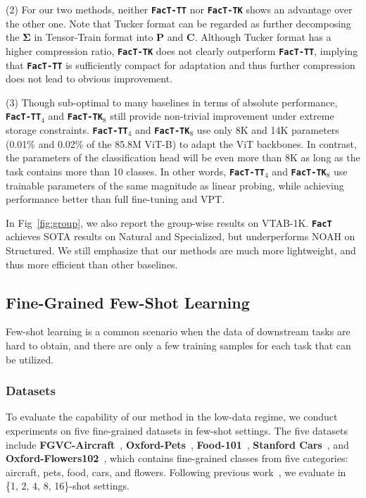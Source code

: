 (2) For our two methods, {neither \texttt{\textbf{FacT-TT}} nor \texttt{\textbf{FacT-TK}} shows an advantage over the other one.} Note that Tucker format can be regarded as further decomposing the $\boldsymbol{\Sigma}$ in Tensor-Train format into $\boldsymbol{P}$ and $\boldsymbol{C}$. Although Tucker format has a higher compression ratio, \texttt{\textbf{FacT-TK}} does not clearly outperform \texttt{\textbf{FacT-TT}}, implying that \texttt{\textbf{FacT-TT}} is sufficiently compact for adaptation and thus further compression does not lead to obvious improvement.

(3) Though sub-optimal to many baselines in terms of absolute performance, {\texttt{\textbf{FacT-TT}}$_{4}$ and \texttt{\textbf{FacT-TK}}$_{8}$ still provide non-trivial improvement under extreme storage constraints.} \texttt{\textbf{FacT-TT}}$_{4}$ and \texttt{\textbf{FacT-TK}}$_{8}$ use only 8K and 14K parameters (0.01\% and 0.02\% of the 85.8M ViT-B) to adapt the ViT backbones. In contrast, the parameters of the classification head will be even more than 8K as long as the task contains more than 10 classes. In other words, \texttt{\textbf{FacT-TT}}$_{4}$ and \texttt{\textbf{FacT-TK}}$_{8}$ use trainable parameters of the same magnitude as linear probing, while achieving performance better than full fine-tuning and VPT.

In Fig~\ref{fig:group}, we also report the group-wise results on VTAB-1K. \texttt{\textbf{FacT}} achieves SOTA results on Natural and Specialized, but underperforms NOAH on Structured. We still emphasize that our methods are much more lightweight, and thus more efficient than other baselines. 

\subsection{Fine-Grained Few-Shot Learning} Few-shot learning is a common scenario when the data of downstream tasks are hard to obtain, and there are only a few training samples for each task that can be utilized.
\subsubsection{Datasets}
To evaluate the capability of our method in the low-data regime, we conduct experiments on five fine-grained datasets in few-shot settings. The five datasets include \textbf{FGVC-Aircraft}~\cite{aircraft}, \textbf{Oxford-Pets}~\cite{pets}, \textbf{Food-101}~\cite{food}, \textbf{Stanford Cars}~\cite{car}, and \textbf{Oxford-Flowers102}~\cite{flower}, which contains fine-grained classes from five categories: aircraft, pets, food, cars, and flowers. Following previous work~\cite{noah}, we evaluate in \{1, 2, 4, 8, 16\}-shot settings.

